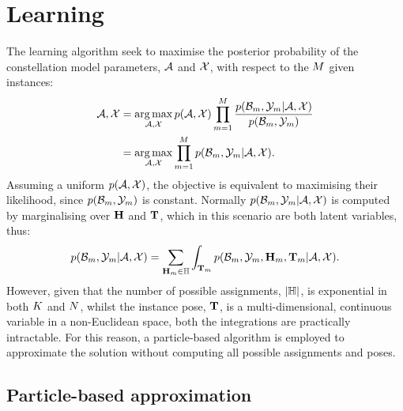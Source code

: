 \section{Learning}
The learning algorithm seek to maximise the posterior probability of the constellation model parameters, $\mathcal{A}$ and $\mathcal{X}$, with respect to the $M$ given instances:  
\begin{equation}
	\begin{aligned}
		\mathcal{A},\mathcal{X} & = \operatorname*{arg\,max}_{\mathcal{A}, \mathcal{X}}
		p(\mathcal{A},\mathcal{X})
		\prod_{m=1}^M 
		\frac{p(\mathcal{B}_m,\mathcal{Y}_m|\mathcal{A},\mathcal{X})}{p(\mathcal{B}_m,\mathcal{Y}_m)} \\ 
		& = \operatorname*{arg\,max}_{\mathcal{A}, \mathcal{X}}
		\prod_{m=1}^M 
		p(\mathcal{B}_m,\mathcal{Y}_m|\mathcal{A},\mathcal{X}).
	\end{aligned}
\end{equation}
Assuming a uniform $p(\mathcal{A},\mathcal{X})$, the objective is equivalent to maximising their likelihood, since $p(\mathcal{B}_m,\mathcal{Y}_m)$ is constant.  
Normally $p(\mathcal{B}_m, \mathcal{Y}_m | \mathcal{A}, \mathcal{X})$ is computed by marginalising over $\mathbf{H}$ and $\mathbf{T}$, which in this scenario are both latent variables, thus:
\begin{equation}
	p(\mathcal{B}_m,\mathcal{Y}_m|\mathcal{A},\mathcal{X}) = 
	\sum_{\mathbf{H}_m \in \mathbb{H}}
	\displaystyle\int_{\mathbf{T}_m}
	p(\mathcal{B}_m,\mathcal{Y}_m,\mathbf{H}_m,\mathbf{T}_m|\mathcal{A},\mathcal{X}).
	\label{eqn/reg/learningobjective}
\end{equation}
However, given that the number of possible assignments, $|\mathbb{H}|$, is exponential in both $K$ and $N$, whilst the instance pose, $\mathbf{T}$, is a multi-dimensional, continuous variable in a non-Euclidean space, both the integrations are practically intractable. For this reason, a particle-based algorithm is employed to approximate the solution without computing all possible assignments and poses.  

\def\spfparticlem{\particle_{\anyinstance}  =  \anyparticle}
\def\spfparticle{\particle  =  \anyparticle} 
\subsection{Particle-based approximation}

